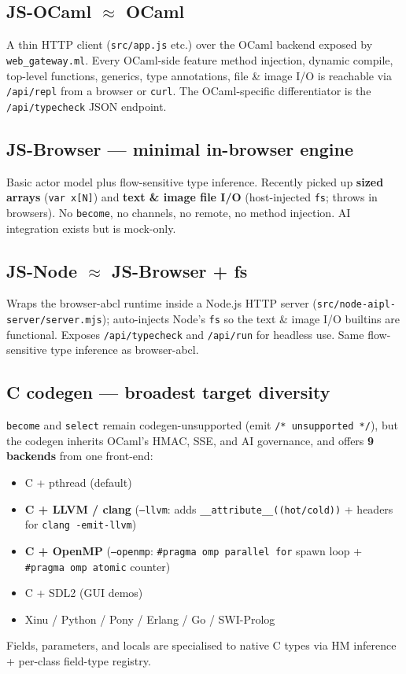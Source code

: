 \documentclass[10pt,a4paper,landscape]{article}
\begin{document}
\subsection*{JS-OCaml $\approx$ OCaml}

A thin HTTP client (\texttt{src/app.js} etc.) over the OCaml
backend exposed by \texttt{web\_gateway.ml}.  Every OCaml-side
feature \textemdash{} method injection, dynamic compile, top-level
functions, generics, type annotations, file \& image I/O
\textemdash{} is reachable via \texttt{/api/repl} from a browser or
\texttt{curl}.  The OCaml-specific differentiator is the
\texttt{/api/typecheck} JSON endpoint.

\subsection*{JS-Browser --- minimal in-browser engine}

Basic actor model plus flow-sensitive type inference.
Recently picked up \textbf{sized arrays} (\texttt{var x[N]}) and
\textbf{text \& image file I/O} (host-injected \texttt{fs}; throws
in browsers).  No \texttt{become}, no channels, no remote, no
method injection.  AI integration exists but is mock-only.

\subsection*{JS-Node $\approx$ JS-Browser + fs}

Wraps the browser-abcl runtime inside a Node.js HTTP server
(\texttt{src/node-aipl-server/server.mjs}); auto-injects Node's
\texttt{fs} so the text \& image I/O builtins are functional.
Exposes \texttt{/api/typecheck} and \texttt{/api/run} for headless
use.  Same flow-sensitive type inference as browser-abcl.

\subsection*{C codegen --- broadest target diversity}

\texttt{become} and \texttt{select} remain codegen-unsupported
(emit \texttt{/* unsupported */}), but the codegen inherits OCaml's
HMAC, SSE, and AI governance, and offers \textbf{9 backends} from
one front-end:
\begin{itemize}\itemsep0pt
  \item C + pthread (default)
  \item \textbf{C + LLVM / clang} (\texttt{--llvm}: adds
    \texttt{\_\_attribute\_\_((hot/cold))} + headers for
    \texttt{clang -emit-llvm})
  \item \textbf{C + OpenMP} (\texttt{--openmp}: \texttt{\#pragma omp
    parallel for} spawn loop + \texttt{\#pragma omp atomic} counter)
  \item C + SDL2 (GUI demos)
  \item Xinu / Python / Pony / Erlang / Go / SWI-Prolog
\end{itemize}
Fields, parameters, and locals are specialised to native C types
via HM inference + per-class field-type registry.
\end{document}
